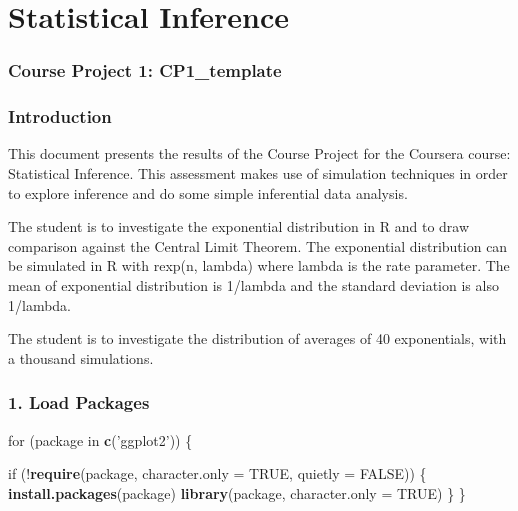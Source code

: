 \documentclass[]{article}
\title{}
\author{}
\date{}
\newenvironment{Shaded}{\begin{snugshade}}{\end{snugshade}}
\newcommand{\KeywordTok}[1]{\textcolor[rgb]{0.13,0.29,0.53}{\textbf{{#1}}}}
\newcommand{\DataTypeTok}[1]{\textcolor[rgb]{0.13,0.29,0.53}{{#1}}}
\newcommand{\StringTok}[1]{\textcolor[rgb]{0.31,0.60,0.02}{{#1}}}
\newcommand{\OtherTok}[1]{\textcolor[rgb]{0.56,0.35,0.01}{{#1}}}
\newcommand{\NormalTok}[1]{{#1}}
\begin{document}
\maketitle


\section{Statistical Inference}\label{statistical-inference}

\subsubsection{Course Project 1:
CP1\_template}\label{course-project-1-cp1ux5ftemplate}

\subsubsection{Introduction}\label{introduction}

This document presents the results of the Course Project for the
Coursera course: Statistical Inference. This assessment makes use of
simulation techniques in order to explore inference and do some simple
inferential data analysis.

The student is to investigate the exponential distribution in R and to
draw comparison against the Central Limit Theorem. The exponential
distribution can be simulated in R with rexp(n, lambda) where lambda is
the rate parameter. The mean of exponential distribution is 1/lambda and
the standard deviation is also 1/lambda.

The student is to investigate the distribution of averages of 40
exponentials, with a thousand simulations.

\subsubsection{1. Load Packages}\label{load-packages}

\begin{Shaded}
\begin{Highlighting}[]
\NormalTok{for (package in }\KeywordTok{c}\NormalTok{(}\StringTok{'ggplot2'}\NormalTok{)) \{}
 
    \NormalTok{if (!}\KeywordTok{require}\NormalTok{(package, }\DataTypeTok{character.only =} \OtherTok{TRUE}\NormalTok{, }\DataTypeTok{quietly =} \OtherTok{FALSE}\NormalTok{)) \{}
        \KeywordTok{install.packages}\NormalTok{(package)}
        \KeywordTok{library}\NormalTok{(package, }\DataTypeTok{character.only =} \OtherTok{TRUE}\NormalTok{)}
    \NormalTok{\}}
\NormalTok{\}}
\end{Highlighting}
\end{Shaded}
\end{document}
